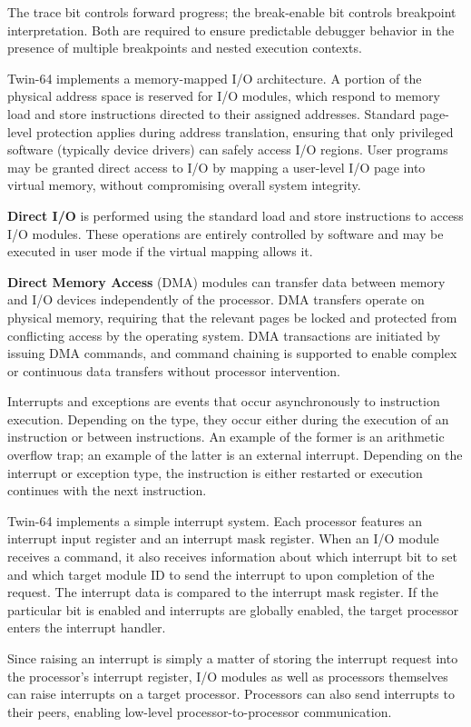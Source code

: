 The trace bit controls forward progress; the break-enable bit controls breakpoint interpretation. Both are required to ensure predictable debugger behavior in the presence of multiple breakpoints and nested execution contexts.


Twin-64 implements a memory-mapped I/O architecture. A portion of the physical address space is reserved for I/O modules, which respond to memory load and store instructions directed to their assigned addresses. Standard page-level protection applies during address translation, ensuring that only privileged software (typically device drivers) can safely access I/O regions. User programs may be granted direct access to I/O by mapping a user-level I/O page into virtual memory, without compromising overall system integrity.

\textbf{Direct I/O} is performed using the standard load and store instructions to access I/O modules. These operations are entirely controlled by software and may be executed in user mode if the virtual mapping allows it.

\textbf{Direct Memory Access} (DMA) modules can transfer data between memory and I/O devices independently of the processor. DMA transfers operate on physical memory, requiring that the relevant pages be locked and protected from conflicting access by the operating system. DMA transactions are initiated by issuing DMA commands, and command chaining is supported to enable complex or continuous data transfers without processor intervention.


Interrupts and exceptions are events that occur asynchronously to instruction execution. Depending on the type, they occur either during the execution of an instruction or between instructions. An example of the former is an arithmetic overflow trap; an example of the latter is an external interrupt. Depending on the interrupt or exception type, the instruction is either restarted or execution continues with the next instruction.

Twin-64 implements a simple interrupt system. Each processor features an interrupt input register and an interrupt mask register. When an I/O module receives a command, it also receives information about which interrupt bit to set and which target module ID to send the interrupt to upon completion of the request. The interrupt data is compared to the interrupt mask register. If the particular bit is enabled and interrupts are globally enabled, the target processor enters the interrupt handler.

Since raising an interrupt is simply a matter of storing the interrupt request into the processor’s interrupt register, I/O modules as well as processors themselves can raise interrupts on a target processor. Processors can also send interrupts to their peers, enabling low-level processor-to-processor communication.
